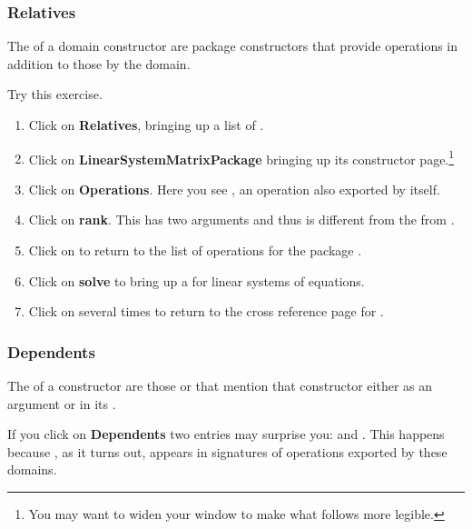 \subsubsection{Relatives}

The  of a domain constructor are package
constructors that provide operations in addition to those
 by the domain.

Try this exercise.
\begin{enumerate}
\item Click on {\bf Relatives}, bringing up a list of
.

\item Click on {\bf LinearSystemMatrixPackage} bringing up its
constructor page.\footnote{You may want to widen your \HyperName{}
window to make what follows more legible.}

\item Click on {\bf Operations}.
Here you see , an operation also exported by
 itself.

\item Click on {\bf rank}.
This  has two arguments and
thus is different from the  from
.

\item Click on \UpBitmap{} to return to the list of operations for the
package .

\item Click on {\bf solve} to bring up a
 for linear systems of
equations.

\item Click on \UpBitmap{} several times to return to the cross
reference page for .
\end{enumerate}

\subsubsection{Dependents}

The  of a constructor are those
 or 
that mention that
constructor either as an argument or in its .

If you click on {\bf Dependents} two entries may surprise you:
 and .
This happens because , as it turns out, appears in
signatures of operations exported by these domains.

